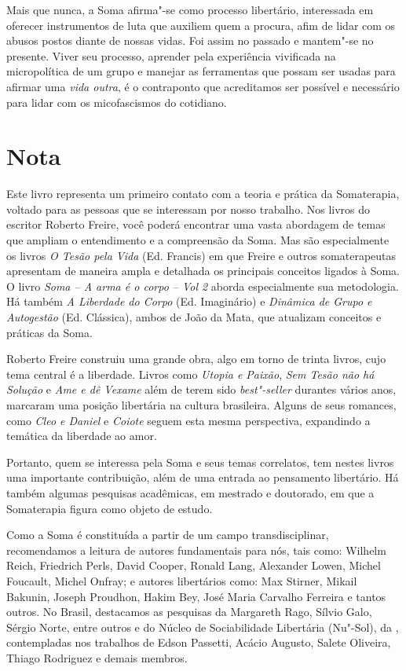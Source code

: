 Mais que nunca, a Soma afirma"-se como processo libertário, interessada
em oferecer instrumentos de luta que auxiliem quem a procura, afim de
lidar com os abusos postos diante de nossas vidas. Foi assim no passado
e mantem"-se no presente. Viver seu processo, aprender pela experiência
vivificada na micropolítica de um grupo e manejar as ferramentas que
possam ser usadas para afirmar uma \emph{vida outra}, é o contraponto
que acreditamos ser possível e necessário para lidar com os
micofascismos do cotidiano.

\chapter{Nota}

Este livro representa um primeiro contato com a teoria e prática da
Somaterapia, voltado para as pessoas que se interessam por nosso
trabalho. Nos livros do escritor Roberto Freire, você poderá encontrar
uma vasta abordagem de temas que ampliam o entendimento e a compreensão
da Soma. Mas são especialmente os livros \emph{O Tesão pela Vida} (Ed.
Francis) em que Freire e outros somaterapeutas apresentam de maneira
ampla e detalhada os principais conceitos ligados à Soma. O livro
\emph{Soma -- A arma é o corpo -- Vol 2} aborda especialmente sua
metodologia. Há também \emph{A Liberdade do Corpo} (Ed.
Imaginário) e \emph{Dinâmica de Grupo e Autogestão} (Ed. Clássica),
ambos de João da Mata, que atualizam conceitos e práticas da Soma.

Roberto Freire construiu uma grande obra, algo em torno de trinta
livros, cujo tema central é a liberdade. Livros como \emph{Utopia e Paixão},
\emph{Sem Tesão não há Solução} e \emph{Ame e dê Vexame} além de terem sido
\emph{best"-seller} durantes vários anos, marcaram uma posição libertária
na cultura brasileira. Alguns de seus romances, como \emph{Cleo e Daniel} e
\emph{Coiote} seguem esta mesma perspectiva, expandindo a temática da
liberdade ao amor.

Portanto, quem se interessa pela Soma e seus temas correlatos, tem
nestes livros uma importante contribuição, além de uma entrada ao
pensamento libertário. Há também algumas pesquisas acadêmicas, em
mestrado e doutorado, em que a Somaterapia figura como objeto de estudo.

Como a Soma é constituída a partir de um campo transdisciplinar,
recomendamos a leitura de autores fundamentais para nós, tais como:
Wilhelm Reich, Friedrich Perls, David Cooper, Ronald Lang, Alexander
Lowen, Michel Foucault, Michel Onfray; e autores libertários como: Max
Stirner, Mikail Bakunin, Joseph Proudhon, Hakim Bey, José Maria Carvalho
Ferreira e tantos outros. No Brasil, destacamos as pesquisas da
Margareth Rago, Sílvio Galo, Sérgio Norte, entre outros e do Núcleo de
Sociabilidade Libertária (Nu"-Sol), da , contempladas nos trabalhos
de Edson Passetti, Acácio Augusto, Salete Oliveira, Thiago Rodriguez e
demais membros.

